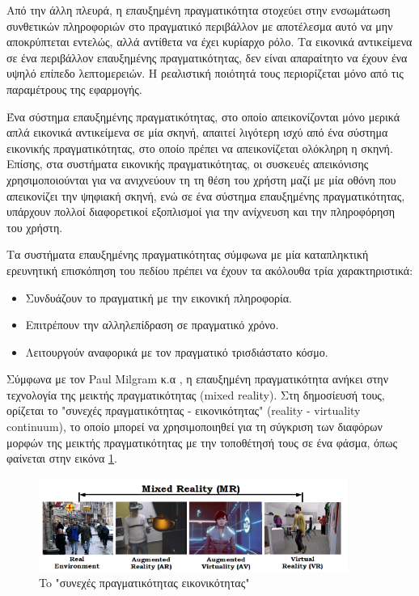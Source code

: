 Από την άλλη πλευρά, η επαυξημένη πραγματικότητα στοχεύει στην ενσωμάτωση συνθετικών πληροφοριών στο πραγματικό περιβάλλον με αποτέλεσμα αυτό να μην αποκρύπτεται εντελώς, αλλά αντίθετα να έχει κυρίαρχο ρόλο. Τα εικονικά αντικείμενα σε ένα περιβάλλον επαυξημένης πραγματικότητας, δεν είναι απαραίτητο να έχουν ένα υψηλό επίπεδο λεπτομερειών. Η ρεαλιστική ποιότητά τους περιορίζεται μόνο από τις παραμέτρους της εφαρμογής. 



Ένα σύστημα επαυξημένης πραγματικότητας, στο οποίο απεικονίζονται μόνο μερικά απλά εικονικά αντικείμενα σε μία σκηνή, απαιτεί λιγότερη ισχύ από ένα σύστημα εικονικής πραγματικότητας, στο οποίο πρέπει να απεικονίζεται ολόκληρη η σκηνή. Επίσης, στα συστήματα εικονικής πραγματικότητας, οι συσκευές απεικόνισης χρησιμοποιούνται για να ανιχνεύουν τη τη θέση του χρήστη μαζί με μία οθόνη που απεικονίζει την ψηφιακή σκηνή, ενώ σε ένα σύστημα επαυξημένης πραγματικότητας, υπάρχουν πολλοί διαφορετικοί εξοπλισμοί για την ανίχνευση και την πληροφόρηση του χρήστη.




Τα συστήματα επαυξημένης πραγματικότητας σύμφωνα με μία καταπληκτική ερευνητική επισκόπηση του πεδίου \cite{azuma1997} πρέπει να έχουν τα ακόλουθα τρία χαρακτηριστικά:


\begin{itemize}
\item Συνδυάζουν το πραγματική με την εικονική πληροφορία.
\item Επιτρέπουν την αλληλεπίδραση σε πραγματικό χρόνο.
\item Λειτουργούν αναφορικά με τον πραγματικό τρισδιάστατο κόσμο.
\end{itemize}  



Σύμφωνα με τον Paul Milgram κ.α \cite{milgram1994taxonomy}, η επαυξημένη πραγματικότητα ανήκει στην τεχνολογία της μεικτής πραγματικότητας (mixed reality). Στη δημοσίευσή τους, ορίζεται το "συνεχές πραγματικότητας - εικονικότητας" (reality - virtuality continuum), το οποίο μπορεί να χρησιμοποιηθεί για τη σύγκριση των διαφόρων μορφών της μεικτής πραγματικότητας με την τοποθέτησή τους σε ένα φάσμα, όπως φαίνεται στην εικόνα \ref{fig:continuum}.


\begin{figure}[H]
    \centering
    \includegraphics[width=0.9\textwidth]{Files/Figures/MR.png}
    \caption[To "συνεχές" πραγματικότητας εικονικότητας"]{ To "συνεχές πραγματικότητας εικονικότητας" \cite{continuum}}
    \label{fig:continuum}
\end{figure}




